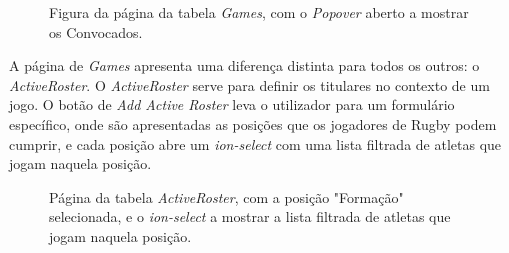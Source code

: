 \begin{figure}[h]
	\begin{center}
	\end{center}
	\caption{Figura da página da tabela \textit{Games}, com o \textit{Popover} aberto a mostrar os Convocados.}\label{fig:athleteprofile}
\end{figure}
A página de \textit{Games} apresenta uma diferença distinta para todos os outros: o \textit{ActiveRoster}. O \textit{ActiveRoster} serve para definir os titulares no contexto de um jogo. O botão de \textit{Add Active Roster} leva o utilizador para um formulário específico, onde são apresentadas as posições que os jogadores de Rugby podem cumprir, e cada posição abre um \textit{ion-select} com uma lista filtrada de atletas que jogam naquela posição.

\begin{figure}[h]
	\begin{center}
	\end{center}
	\caption{Página da tabela \textit{ActiveRoster}, com a posição "Formação" selecionada, e o \textit{ion-select} a mostrar a lista filtrada de atletas que jogam naquela posição.}\label{fig:athleteprofile}
\end{figure}
\newpage


